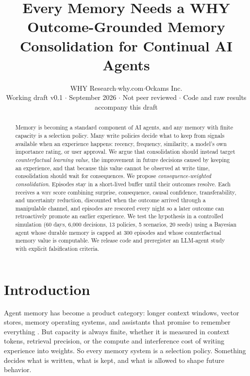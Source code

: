 \documentclass[11pt]{article}
\title{\vspace{-1.2em}\textbf{Every Memory Needs a WHY}\\[6pt]
\large Outcome-Grounded Memory Consolidation for Continual AI Agents}
\author{WHY Research\quad$\cdot$\quad why.com\quad$\cdot$\quad Ockams Inc.\\[4pt]
\small\color{ink2} Working draft v0.1 $\cdot$ September 2026 $\cdot$ Not peer reviewed $\cdot$ Code and raw results accompany this draft}
\date{}
\newcommand{\WHY}{\textsc{why}}
\begin{document}
\maketitle
\vspace{-1.5em}

\begin{abstract}
\noindent Memory is becoming a standard component of AI agents, and any memory with finite capacity is a selection policy. Many write policies decide what to keep from signals available when an experience happens: recency, frequency, similarity, a model's own importance rating, or user approval. We argue that consolidation should instead target \emph{counterfactual learning value}, the improvement in future decisions caused by keeping an experience, and that because this value cannot be observed at write time, consolidation should wait for consequences. We propose \emph{consequence-weighted consolidation}. Episodes stay in a short-lived buffer until their outcomes resolve. Each receives a \WHY{} score combining surprise, consequence, causal confidence, transferability, and uncertainty reduction, discounted when the outcome arrived through a manipulable channel, and episodes are rescored every night so a later outcome can retroactively promote an earlier experience. We test the hypothesis in a controlled simulation (60 days, 6{,}000 decisions, 13 policies, 5 scenarios, 20 seeds) using a Bayesian agent whose durable memory is capped at 300 episodes and whose counterfactual memory value is computable. \AbstractResults{} We release code and preregister an LLM-agent study with explicit falsification criteria.
\end{abstract}

\section{Introduction}

Agent memory has become a product category: longer context windows, vector stores, memory operating systems, and assistants that promise to remember everything \citep{packer2023,chhikara2025mem0,xu2025amem,zhong2024memorybank}. But capacity is always finite, whether it is measured in context tokens, retrieval precision, or the compute and interference cost of writing experience into weights. So every memory system is a selection policy. Something decides what is written, what is kept, and what is allowed to shape future behavior.
\end{document}
